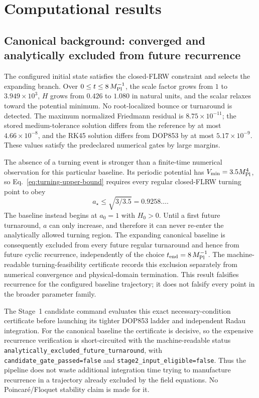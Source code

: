 \section{Computational results}
\subsection{Canonical background: converged and analytically excluded from future recurrence}
The configured initial state satisfies the closed-FLRW constraint and selects the expanding branch. Over $0\le t\le8\,M_{\mathrm{Pl}}^{-1}$, the scale factor grows from $1$ to $3.949\times10^3$, $H$ grows from $0.426$ to $1.080$ in natural units, and the scalar relaxes toward the potential minimum. No root-localized bounce or turnaround is detected. The maximum normalized Friedmann residual is $8.75\times10^{-11}$; the stored medium-tolerance solution differs from the reference by at most $4.66\times10^{-8}$, and the RK45 solution differs from DOP853 by at most $5.17\times10^{-9}$. These values satisfy the predeclared numerical gates by large margins.

The absence of a turning event is stronger than a finite-time numerical observation for this particular baseline. Its periodic potential has $V_{\min}=3.5M_{\mathrm{Pl}}^4$, so Eq.~\eqref{eq:turning-upper-bound} requires every regular closed-FLRW turning point to obey
\begin{equation}
a_\star\le\sqrt{3/3.5}=0.9258\ldots .
\end{equation}
The baseline instead begins at $a_0=1$ with $H_0>0$. Until a first future turnaround, $a$ can only increase, and therefore it can never re-enter the analytically allowed turning region. The expanding canonical baseline is consequently excluded from every future regular turnaround and hence from future cyclic recurrence, independently of the choice $t_{\rm end}=8\,M_{\mathrm{Pl}}^{-1}$. The machine-readable turning-feasibility certificate records this exclusion separately from numerical convergence and physical-domain termination. This result falsifies recurrence for the configured baseline trajectory; it does not falsify every point in the broader parameter family.

The Stage~1 candidate command evaluates this exact necessary-condition certificate before launching its tighter DOP853 ladder and independent Radau integration. For the canonical baseline the certificate is decisive, so the expensive recurrence verification is short-circuited with the machine-readable status \texttt{analytically\_excluded\_future\_turnaround}, with \texttt{candidate\_gate\_passed=false} and \texttt{stage2\_input\_eligible=false}. Thus the pipeline does not waste additional integration time trying to manufacture recurrence in a trajectory already excluded by the field equations. No Poincar\'e/Floquet stability claim is made for it.

